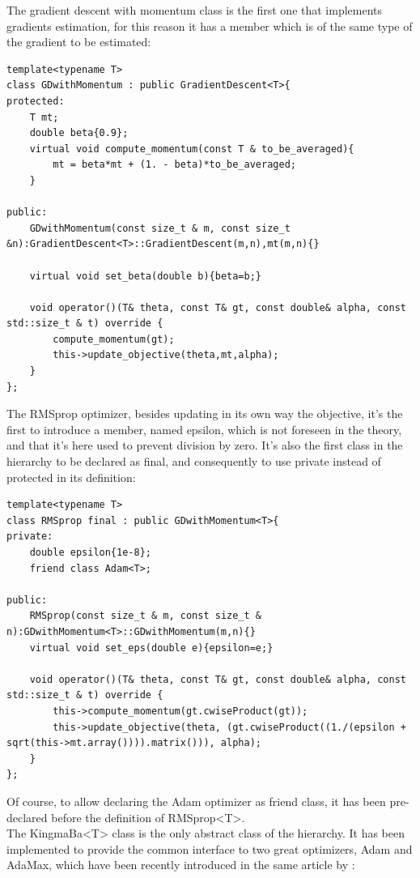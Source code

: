 \documentclass[12pt, a4paper]{report}
\theoremstyle{definition}
\begin{document}
\newline \noindent The gradient descent with momentum class is the first one that implements gradients estimation, for this reason it has a member which is of the same type of the gradient to be estimated:
\begin{lstlisting}[frame=single]
template<typename T>
class GDwithMomentum : public GradientDescent<T>{
protected:
	T mt;
	double beta{0.9};
	virtual void compute_momentum(const T & to_be_averaged){
		mt = beta*mt + (1. - beta)*to_be_averaged;
	}

public:
	GDwithMomentum(const size_t & m, const size_t &n):GradientDescent<T>::GradientDescent(m,n),mt(m,n){}

	virtual void set_beta(double b){beta=b;}

	void operator()(T& theta, const T& gt, const double& alpha, const std::size_t & t) override {
		compute_momentum(gt);
		this->update_objective(theta,mt,alpha);
	}
};
\end{lstlisting}
\newpage \noindent The RMSprop optimizer, besides updating in its own way the objective, it's the first to introduce a member, named epsilon, which is not foreseen in the theory, and that it's here used to prevent division by zero. It's also the first class in the hierarchy to be declared as final, and consequently to use {\ttfamily private} instead of {\ttfamily protected} in its definition: 
\begin{lstlisting}[frame=single]
template<typename T>
class RMSprop final : public GDwithMomentum<T>{
private:
	double epsilon{1e-8};
	friend class Adam<T>;

public:
	RMSprop(const size_t & m, const size_t & n):GDwithMomentum<T>::GDwithMomentum(m,n){}
	virtual void set_eps(double e){epsilon=e;}

	void operator()(T& theta, const T& gt, const double& alpha, const std::size_t & t) override {
		this->compute_momentum(gt.cwiseProduct(gt));
		this->update_objective(theta, (gt.cwiseProduct((1./(epsilon + sqrt(this->mt.array()))).matrix())), alpha);
	}
};
\end{lstlisting}
\noindent Of course, to allow declaring the Adam optimizer as friend class, it has been pre-declared before the definition of {\ttfamily RMSprop<T>}.\\
\newline\noindent The {\ttfamily KingmaBa<T>} class is the only abstract class of the hierarchy. It has been implemented to provide the common interface to two great optimizers, Adam and AdaMax, which have been recently introduced in the same article by \cite{Kingma}:
\end{document}
